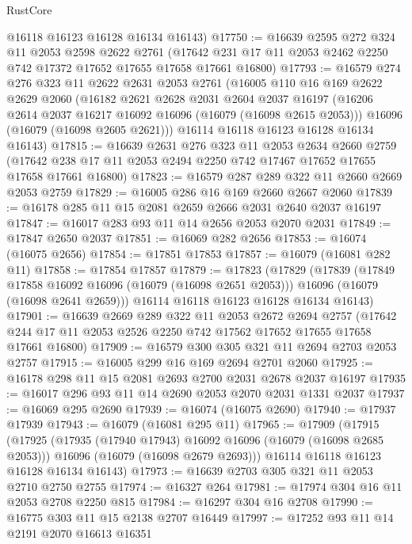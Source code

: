 \begin{lexlean}{RustCore}
\begin{coremodule}
      @16118
      @16123
      @16128
      @16134
      @16143)
@17750 := @16639
    @2595
    @272
    @324
    @11
    @2053
    @2598
    @2622
    @2761
    (@17642 @231 @17 @11 @2053 @2462 @2250 @742 @17372 @17652 @17655 @17658 @17661 @16800)
@17793 := @16579
    @274
    @276
    @323
    @11
    @2622
    @2631
    @2053
    @2761
    (@16005
      @110
      @16
      @169
      @2622
      @2629
      @2060
      (@16182
        @2621
        @2628
        @2031
        @2604
        @2037
        @16197
        (@16206 @2614 @2037 @16217 @16092 @16096 (@16079 (@16098 @2615 @2053)))
        @16096
        (@16079 (@16098 @2605 @2621)))
      @16114
      @16118
      @16123
      @16128
      @16134
      @16143)
@17815 := @16639
    @2631
    @276
    @323
    @11
    @2053
    @2634
    @2660
    @2759
    (@17642 @238 @17 @11 @2053 @2494 @2250 @742 @17467 @17652 @17655 @17658 @17661 @16800)
@17823 := @16579 @287 @289 @322 @11 @2660 @2669 @2053 @2759
@17829 := @16005 @286 @16 @169 @2660 @2667 @2060
@17839 := @16178 @285 @11 @15 @2081 @2659 @2666 @2031 @2640 @2037 @16197
@17847 := @16017 @283 @93 @11 @14 @2656 @2053 @2070 @2031
@17849 := @17847 @2650 @2037
@17851 := @16069 @282 @2656
@17853 := @16074 (@16075 @2656)
@17854 := @17851 @17853
@17857 := @16079 (@16081 @282 @11)
@17858 := @17854 @17857
@17879 := @17823
    (@17829
      (@17839
        (@17849 @17858 @16092 @16096 (@16079 (@16098 @2651 @2053)))
        @16096
        (@16079 (@16098 @2641 @2659)))
      @16114
      @16118
      @16123
      @16128
      @16134
      @16143)
@17901 := @16639
    @2669
    @289
    @322
    @11
    @2053
    @2672
    @2694
    @2757
    (@17642 @244 @17 @11 @2053 @2526 @2250 @742 @17562 @17652 @17655 @17658 @17661 @16800)
@17909 := @16579 @300 @305 @321 @11 @2694 @2703 @2053 @2757
@17915 := @16005 @299 @16 @169 @2694 @2701 @2060
@17925 := @16178 @298 @11 @15 @2081 @2693 @2700 @2031 @2678 @2037 @16197
@17935 := @16017 @296 @93 @11 @14 @2690 @2053 @2070 @2031 @1331 @2037
@17937 := @16069 @295 @2690
@17939 := @16074 (@16075 @2690)
@17940 := @17937 @17939
@17943 := @16079 (@16081 @295 @11)
@17965 := @17909
    (@17915
      (@17925
        (@17935 (@17940 @17943) @16092 @16096 (@16079 (@16098 @2685 @2053)))
        @16096
        (@16079 (@16098 @2679 @2693)))
      @16114
      @16118
      @16123
      @16128
      @16134
      @16143)
@17973 := @16639 @2703 @305 @321 @11 @2053 @2710 @2750 @2755
@17974 := @16327 @264
@17981 := @17974 @304 @16 @11 @2053 @2708 @2250 @815
@17984 := @16297 @304 @16 @2708
@17990 := @16775 @303 @11 @15 @2138 @2707 @16449
@17997 := @17252 @93 @11 @14 @2191 @2070 @16613 @16351

\end{coremodule}
\end{lexlean}
